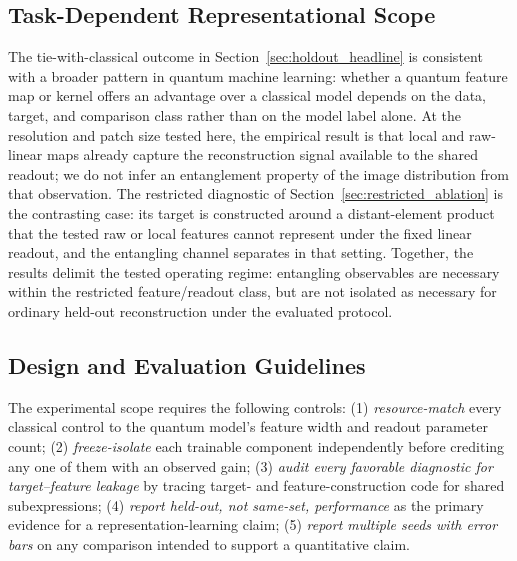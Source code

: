 \documentclass[11pt]{article}
\begin{document}
\subsection{Task-Dependent Representational Scope}
\label{sec:task_dependent}
The tie-with-classical outcome in Section~\ref{sec:holdout_headline} is consistent with a broader pattern in quantum machine learning: whether a quantum feature map or kernel offers an advantage over a classical model depends on the data, target, and comparison class rather than on the model label alone. At the resolution and patch size tested here, the empirical result is that local and raw-linear maps already capture the reconstruction signal available to the shared readout; we do not infer an entanglement property of the image distribution from that observation. The restricted diagnostic of Section~\ref{sec:restricted_ablation} is the contrasting case: its target is constructed around a distant-element product that the tested raw or local features cannot represent under the fixed linear readout, and the entangling channel separates in that setting. Together, the results delimit the tested operating regime: entangling observables are necessary within the restricted feature/readout class, but are not isolated as necessary for ordinary held-out reconstruction under the evaluated protocol.

\subsection{Design and Evaluation Guidelines}
The experimental scope requires the following controls: (1) \emph{resource-match} every classical control to the quantum model's feature width and readout parameter count; (2) \emph{freeze-isolate} each trainable component independently before crediting any one of them with an observed gain; (3) \emph{audit every favorable diagnostic for target--feature leakage} by tracing target- and feature-construction code for shared subexpressions; (4) \emph{report held-out, not same-set, performance} as the primary evidence for a representation-learning claim; (5) \emph{report multiple seeds with error bars} on any comparison intended to support a quantitative claim.
\end{document}
